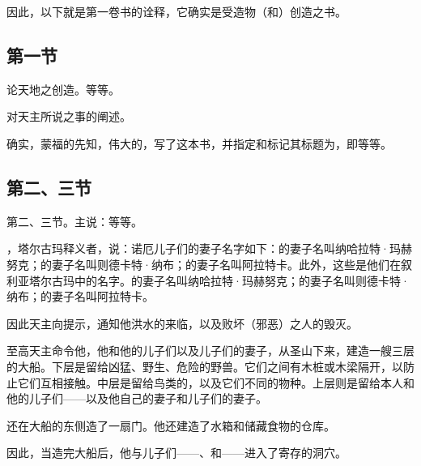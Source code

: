因此，以下就是第一卷书的诠释，它确实是受造物（和）创造之书。\par


\subsection{第一节}

论天地之创造。等等。\par

对天主所说之事的阐述。\par

确实，蒙福的先知，伟大的，写了这本书，并指定和标记其标题为，即等等。\par


\subsection{第二、三节}

第二、三节。主说：等等。\par

，塔尔古玛释义者，说：诺厄儿子们的妻子名字如下：的妻子名叫纳哈拉特·玛赫努克；的妻子名叫则德卡特·纳布；的妻子名叫阿拉特卡。此外，这些是他们在叙利亚塔尔古玛中的名字。的妻子名叫纳哈拉特·玛赫努克；的妻子名叫则德卡特·纳布；的妻子名叫阿拉特卡。\par

因此天主向提示，通知他洪水的来临，以及败坏（邪恶）之人的毁灭。\par

至高天主命令他，他和他的儿子们以及儿子们的妻子，从圣山下来，建造一艘三层的大船。下层是留给凶猛、野生、危险的野兽。它们之间有木桩或木梁隔开，以防止它们互相接触。中层是留给鸟类的，以及它们不同的物种。上层则是留给本人和他的儿子们——以及他自己的妻子和儿子们的妻子。\par

还在大船的东侧造了一扇门。他还建造了水箱和储藏食物的仓库。\par

因此，当造完大船后，他与儿子们——、和——进入了寄存的洞穴。\par

